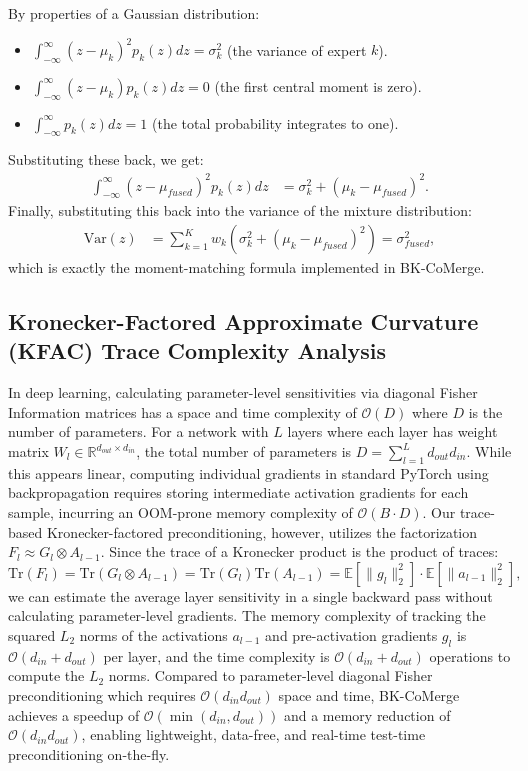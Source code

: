 \documentclass{article}
\theoremstyle{plain}
\theoremstyle{definition}
\theoremstyle{remark}
\begin{document}
By properties of a Gaussian distribution:
\begin{itemize}
    \item $\int_{-\infty}^\infty (z - \mu_k)^2 p_k(z) dz = \sigma_k^2$ (the variance of expert $k$).
    \item $\int_{-\infty}^\infty (z - \mu_k) p_k(z) dz = 0$ (the first central moment is zero).
    \item $\int_{-\infty}^\infty p_k(z) dz = 1$ (the total probability integrates to one).
\end{itemize}
Substituting these back, we get:
\begin{align}
\int_{-\infty}^\infty (z - \mu_{fused})^2 p_k(z) dz &= \sigma_k^2 + (\mu_k - \mu_{fused})^2.
\end{align}
Finally, substituting this back into the variance of the mixture distribution:
\begin{align}
\text{Var}(z) &= \sum_{k=1}^K w_k \left( \sigma_k^2 + (\mu_k - \mu_{fused})^2 \right) = \sigma_{fused}^2,
\end{align}
which is exactly the moment-matching formula implemented in BK-CoMerge.

\subsection{Kronecker-Factored Approximate Curvature (KFAC) Trace Complexity Analysis}
In deep learning, calculating parameter-level sensitivities via diagonal Fisher Information matrices has a space and time complexity of $\mathcal{O}(D)$ where $D$ is the number of parameters. For a network with $L$ layers where each layer has weight matrix $W_l \in \mathbb{R}^{d_{out} \times d_{in}}$, the total number of parameters is $D = \sum_{l=1}^L d_{out} d_{in}$. While this appears linear, computing individual gradients in standard PyTorch using backpropagation requires storing intermediate activation gradients for each sample, incurring an OOM-prone memory complexity of $\mathcal{O}(B \cdot D)$.
Our trace-based Kronecker-factored preconditioning, however, utilizes the factorization $F_l \approx G_l \otimes A_{l-1}$. Since the trace of a Kronecker product is the product of traces:
\begin{equation}
\text{Tr}(F_l) = \text{Tr}(G_l \otimes A_{l-1}) = \text{Tr}(G_l)\text{Tr}(A_{l-1}) = \mathbb{E}[\|g_l\|_2^2] \cdot \mathbb{E}[\|a_{l-1}\|_2^2],
\end{equation}
we can estimate the average layer sensitivity in a single backward pass without calculating parameter-level gradients.
The memory complexity of tracking the squared $L_2$ norms of the activations $a_{l-1}$ and pre-activation gradients $g_l$ is $\mathcal{O}(d_{in} + d_{out})$ per layer, and the time complexity is $\mathcal{O}(d_{in} + d_{out})$ operations to compute the $L_2$ norms. Compared to parameter-level diagonal Fisher preconditioning which requires $\mathcal{O}(d_{in} d_{out})$ space and time, BK-CoMerge achieves a speedup of $\mathcal{O}(\min(d_{in}, d_{out}))$ and a memory reduction of $\mathcal{O}(d_{in} d_{out})$, enabling lightweight, data-free, and real-time test-time preconditioning on-the-fly.
\end{document}
